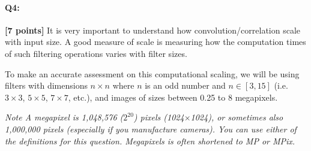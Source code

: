 \documentclass[11pt]{article}
\begin{document}

\pagebreak
\paragraph{Q4:} \textbf{[7 points]}
    It is very important to understand how convolution/correlation scale with input size. A good measure of scale is measuring how the computation times of such filtering operations varies with filter sizes.
    
    To make an accurate assessment on this computational scaling, we will be using filters with dimensions $n \times n$ where $n$ is an odd number and $n \in [3, 15]$ (i.e. $3\times3$, $5\times5$, $7\times7$, etc.), and images of sizes between 0.25 to 8 megapixels.
    
\emph{Note A megapixel is 1,048,576 ($2^{20}$) pixels (1024$\times$1024), or sometimes also 1,000,000 pixels (especially if you manufacture cameras). You can use either of the definitions for this question. Megapixels is often shortened to MP or MPix.}
\end{document}
